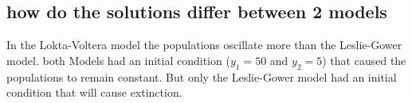 \documentclass{article}
\begin{document}
\subsection{how do the solutions differ between 2 models}
In the Lokta-Voltera model the populations oscillate more than the Leslie-Gower model. both Models had an initial condition ($y_1 = 50$ and $y_2 = 5$) that caused the populations to remain constant. But only the Leslie-Gower model had an initial condition that will cause extinction.
\end{document}
